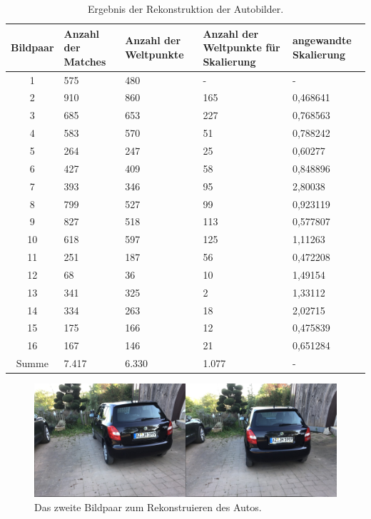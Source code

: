 \begin{table}
    \begin{tabularx}{\textwidth}{cXXXX}
        \toprule
        Bildpaar &  Anzahl der Matches & Anzahl der Weltpunkte & Anzahl der Weltpunkte für Skalierung & angewandte Skalierung \\ 
        \midrule
        1  & 575 & 480 & -  & - \\
        2  & 910 & 860 & 165 & 0,468641 \\
        3  & 685 & 653 & 227 & 0,768563 \\
        4  & 583 & 570 & 51  & 0,788242 \\
        5  & 264 & 247 & 25  & 0,60277 \\
        6  & 427 & 409 & 58  & 0,848896 \\
        7  & 393 & 346 & 95  & 2,80038 \\
        8  & 799 & 527 & 99  & 0,923119 \\
        9  & 827 & 518 & 113 & 0,577807 \\
        10 & 618 & 597 & 125 & 1,11263 \\
        11 & 251 & 187 & 56  & 0,472208 \\
        12 & 68  & 36  & 10  & 1,49154 \\
        13 & 341 & 325 & 2   & 1,33112 \\
        14 & 334 & 263 & 18  & 2,02715 \\
        15 & 175 & 166 & 12  & 0,475839 \\
        16 & 167 & 146 & 21  & 0,651284 \\
        \midrule
        Summe & 7.417 & 6.330 & 1.077 & - \\
        \bottomrule
    \end{tabularx}
    \caption{Ergebnis der Rekonstruktion der Autobilder.}
    \label{tab:car-results}
\end{table}

\begin{figure}[b]
    \includegraphics[width=\textwidth]{src/img/car_second_pair.jpg}
    \caption{Das zweite Bildpaar zum Rekonstruieren des Autos.}
    \label{fig:car-second-pair}
\end{figure}

